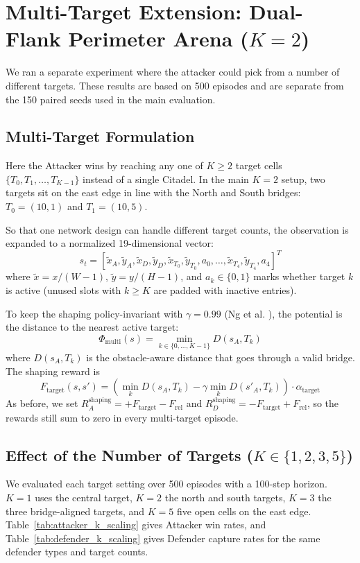\documentclass[conference]{IEEEtran}
\begin{document}
\section{Multi-Target Extension: Dual-Flank Perimeter Arena ($K=2$)}
\label{sec:multi_target}

We ran a separate experiment where the attacker could pick from a number of different targets. These results are based on 500 episodes and are separate from the 150 paired seeds used in the main evaluation.

\subsection{Multi-Target Formulation}
Here the Attacker wins by reaching any one of $K \ge 2$ target cells $\{T_0, T_1, \dots, T_{K-1}\}$ instead of a single Citadel. In the main $K=2$ setup, two targets sit on the east edge in line with the North and South bridges: $T_0 = (10, 1)$ and $T_1 = (10, 5)$.

So that one network design can handle different target counts, the observation is expanded to a normalized 19-dimensional vector:
\begin{equation}
s_t = \left[ \tilde{x}_A, \tilde{y}_A, \tilde{x}_D, \tilde{y}_D, \tilde{x}_{T_0}, \tilde{y}_{T_0}, a_0, \dots, \tilde{x}_{T_4}, \tilde{y}_{T_4}, a_4 \right]^T
\end{equation}
where $\tilde{x} = x / (W-1)$, $\tilde{y} = y / (H-1)$, and $a_k \in \{0, 1\}$ marks whether target $k$ is active (unused slots with $k \ge K$ are padded with inactive entries).

To keep the shaping policy-invariant with $\gamma = 0.99$ (Ng et al. \cite{ng1999policy}), the potential is the distance to the nearest active target:
\begin{equation}
\Phi_{\text{multi}}(s) = \min_{k \in \{0, \dots, K-1\}} D(s_A, T_k)
\end{equation}
where $D(s_A, T_k)$ is the obstacle-aware distance that goes through a valid bridge. The shaping reward is
\begin{equation}
F_{\text{target}}(s, s') = \left( \min_{k} D(s_A, T_k) - \gamma \min_{k} D(s'_A, T_k) \right) \cdot \alpha_{\text{target}}
\end{equation}
As before, we set $R_A^{\text{shaping}} = +F_{\text{target}} - F_{\text{rel}}$ and $R_D^{\text{shaping}} = -F_{\text{target}} + F_{\text{rel}}$, so the rewards still sum to zero in every multi-target episode.

\subsection{Effect of the Number of Targets ($K \in \{1, 2, 3, 5\}$)}
We evaluated each target setting over 500 episodes with a 100-step horizon. $K=1$ uses the central target, $K=2$ the north and south targets, $K=3$ the three bridge-aligned targets, and $K=5$ five open cells on the east edge. Table~\ref{tab:attacker_k_scaling} gives Attacker win rates, and Table~\ref{tab:defender_k_scaling} gives Defender capture rates for the same defender types and target counts.
\end{document}
